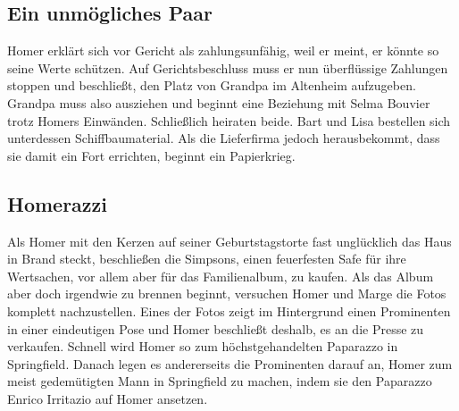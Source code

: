 
\subsection{Ein unmögliches Paar}\label{JABF08}
Homer erklärt sich vor Gericht als zahlungsunfähig, weil er meint, er könnte so seine Werte schützen. Auf Gerichtsbeschluss muss er nun überflüssige Zahlungen stoppen und beschließt, den Platz von Grandpa im Altenheim aufzugeben. Grandpa muss also ausziehen und beginnt eine Beziehung mit Selma Bouvier trotz Homers Einwänden. Schließlich heiraten beide. Bart und Lisa bestellen sich unterdessen Schiffbaumaterial. Als die Lieferfirma jedoch herausbekommt, dass sie damit ein Fort errichten, beginnt ein Papierkrieg.



\subsection{Homerazzi}\label{JABF06}
Als Homer mit den Kerzen auf seiner Geburtstagstorte fast unglücklich das Haus in Brand steckt, beschließen die Simpsons, einen feuerfesten Safe für ihre Wertsachen, vor allem aber für das Familienalbum, zu kaufen. Als das Album aber doch irgendwie zu brennen beginnt, versuchen Homer und Marge die Fotos komplett nachzustellen. Eines der Fotos zeigt im Hintergrund einen Prominenten in einer eindeutigen Pose und Homer beschließt deshalb, es an die Presse zu verkaufen. Schnell wird Homer so zum höchstgehandelten Paparazzo in Springfield. Danach legen es andererseits die Prominenten darauf an, Homer zum meist gedemütigten Mann in Springfield zu machen, indem sie den Paparazzo Enrico Irritazio auf Homer ansetzen.

